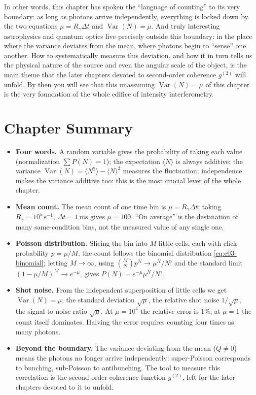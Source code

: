 In other words, this chapter has spoken the ``language of counting'' to its very boundary: as long as photons arrive independently, everything is locked down by the two equations $\mu=R_\gamma\Delta t$ and $\operatorname{Var}(N)=\mu$. And truly interesting astrophysics and quantum optics live precisely outside this boundary: in the place where the variance deviates from the mean, where photons begin to ``sense'' one another. How to systematically measure this deviation, and how it in turn tells us the physical nature of the source and even the angular scale of the object, is the main theme that the later chapters devoted to second-order coherence $g^{(2)}$ will unfold. By then you will see that this unassuming $\operatorname{Var}(N)=\mu$ of this chapter is the very foundation of the whole edifice of intensity interferometry.

\section{Chapter Summary}
\label{sec:e03-summary}

\begin{itemize}
  \item \textbf{Four words.} A random variable gives the probability of taking each value (normalization $\sum P(N)=1$); the expectation $\langle N\rangle$ is always additive; the variance $\operatorname{Var}(N)=\langle N^2\rangle-\langle N\rangle^2$ measures the fluctuation; independence makes the variance additive too: this is the most crucial lever of the whole chapter.
  \item \textbf{Mean count.} The mean count of one time bin is $\mu=R_\gamma\Delta t$; taking $R_\gamma=10^5\,\mathrm{s^{-1}}$, $\Delta t=1\,\mathrm{ms}$ gives $\mu=100$. ``On average'' is the destination of many same-condition bins, not the measured value of any single one.
  \item \textbf{Poisson distribution.} Slicing the bin into $M$ little cells, each with click probability $p=\mu/M$, the count follows the binomial distribution \eqref{eq:e03-binomial}; letting $M\to\infty$, using $\binom{M}{N}p^N\to\mu^N/N!$ and the standard limit $(1-\mu/M)^M\to e^{-\mu}$, gives $P(N)=e^{-\mu}\mu^N/N!$.
  \item \textbf{Shot noise.} From the independent superposition of little cells we get $\operatorname{Var}(N)=\mu$; the standard deviation $\sqrt{\mu}$, the relative shot noise $1/\sqrt{\mu}$, the signal-to-noise ratio $\sqrt{\mu}$. At $\mu=10^4$ the relative error is $1\%$; at $\mu=1$ the count itself dominates. Halving the error requires counting four times as many photons.
  \item \textbf{Beyond the boundary.} The variance deviating from the mean ($Q\neq0$) means the photons no longer arrive independently: super-Poisson corresponds to bunching, sub-Poisson to antibunching. The tool to measure this correlation is the second-order coherence function $g^{(2)}$, left for the later chapters devoted to it to unfold.
\end{itemize}

